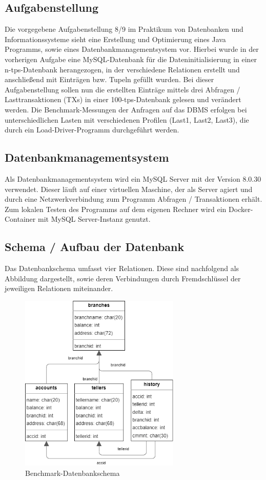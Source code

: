 \subsection{Aufgabenstellung}\label{subsec:aufgabenstellung}
Die vorgegebene Aufgabenstellung 8/9 im Praktikum von Datenbanken und Informationssysteme sieht eine Erstellung und Optimierung eines Java Programms, sowie eines Datenbankmanagementsystem vor.
Hierbei wurde in der vorherigen Aufgabe eine MySQL-Datenbank für die Dateninitialisierung in einer n-tps-Datenbank herangezogen, in der verschiedene Relationen erstellt und anschließend mit Einträgen bzw. Tupeln gefüllt wurden.
Bei dieser Aufgabenstellung sollen nun die erstellten Einträge mittels drei Abfragen / Lasttransaktionen (TXs) in einer 100-tps-Datenbank gelesen und verändert werden.
Die Benchmark-Messungen der Anfragen auf das DBMS erfolgen bei unterschiedlichen Lasten mit verschiedenen Profilen (Last1, Last2, Last3), die durch ein Load-Driver-Programm durchgeführt werden.
\subsection{Datenbankmanagementsystem}\label{subsec:datenbankmanagementsystem-einleitung}
Als Datenbankmanagementsystem wird ein MySQL Server mit der Version 8.0.30 verwendet.
Dieser läuft auf einer virtuellen Maschine, der als Server agiert und durch eine Netzwerkverbindung zum Programm Abfragen / Transaktionen erhält.
Zum lokalen Testen des Programms auf dem eigenen Rechner wird ein Docker-Container mit MySQL Server-Instanz genutzt.
\subsection{Schema / Aufbau der Datenbank}\label{subsec:schema/aufbau}
Das Datenbankschema umfasst vier Relationen.
Diese sind nachfolgend als Abbildung dargestellt, sowie deren Verbindungen durch Fremdschlüssel der jeweiligen Relationen miteinander.
\begin{figure}[h!]
    \center
    \includegraphics[height=8.5cm]{assets/img/benchmark-datenbank-schema}
    \caption{Benchmark-Datenbankschema}
    \label{fig:benchmark-datenbankschema}
\end{figure}
